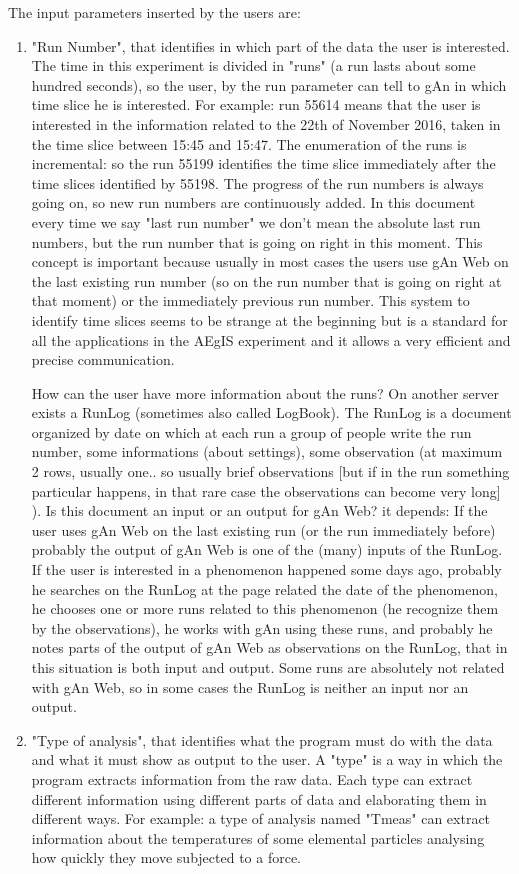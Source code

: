 The input parameters inserted by the users are:
\begin{enumerate}

\item "Run Number", that identifies in which part of the data the user is interested. 
The time in this experiment is divided in "runs" (a run lasts about some hundred seconds), so the user, by the run parameter can tell to gAn in which time slice he is interested. For example: run 55614 means that the user is interested in the information related to the 22th of November 2016, taken in the time slice between 15:45 and 15:47. 
The enumeration of the runs is incremental: so the run 55199 identifies the time slice immediately after the time slices identified by 55198. The progress of the run numbers is always going on, so new run numbers are continuously added. 
In this document every time we say "last run number" we don't mean the absolute last run numbers, but the run number that is going on right in this moment. This concept is important because usually in most cases the users use gAn Web on the last existing run number (so on the run number that is going on right at that moment) or the immediately previous run number.  
This system to identify time slices seems to be strange at the beginning but is a standard for all the applications in the AEgIS experiment and it allows a very efficient and precise communication.

How can the user have more information about the runs? 
On another server exists a RunLog (sometimes also called LogBook). The RunLog is a document organized by date on which at each run a group of people write the run number, some informations (about settings), some observation (at maximum 2 rows, usually one.. so usually brief observations [but if in the run something particular happens, in that rare case the observations can become very long] ). 
Is this document an input or an output for gAn Web? it depends:
If the user uses gAn Web on the last existing run (or the run immediately before) probably the output of gAn Web is one of the (many) inputs of the RunLog.  
If the user is interested in a phenomenon happened some days ago, probably he searches on the RunLog at the page related the date of the phenomenon, he chooses one or more runs related to this phenomenon (he recognize them by the observations), he works with gAn using these runs, and probably he notes parts of the output of gAn Web as observations on the RunLog, that in this situation is both input and output. Some runs are absolutely not related with gAn Web, so in some cases the RunLog is neither an input nor an output.  

\item "Type of analysis", that identifies what the program must do with the data and what it must show as output to the user.
A "type" is a way in which the program extracts information from the raw data. Each type can extract different information using different parts of data and elaborating them in different ways. For example: a type of analysis named "Tmeas" can extract information about the temperatures of some elemental particles analysing how quickly they move subjected to a force. 

\end{enumerate}


